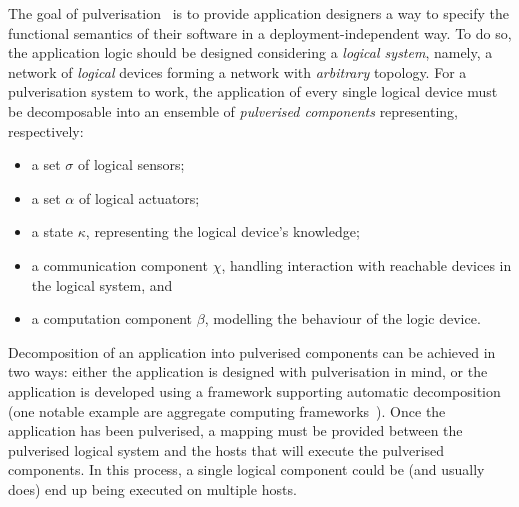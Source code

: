 \documentclass[conference]{IEEEtran}
\begin{document}
The goal of pulverisation~\cite{FI2020-pulverization}
is to provide application designers a way to specify the functional semantics of their software in a deployment-independent way.
%
To do so,
the application logic should be designed considering a \emph{logical system},
namely, a network of \emph{logical} devices forming a network with \emph{arbitrary} topology.
%
For a pulverisation system to work,
the application of every single logical device must be decomposable into an ensemble of \emph{pulverised components}
representing, respectively:
\begin{itemize}
    \item a set $\sigma$ of logical sensors;
    \item a set $\alpha$ of logical actuators;
    \item a state $\kappa$, representing the logical device's knowledge;
    \item a communication component $\chi$,
    handling interaction with reachable devices in the logical system, and
    \item a computation component $\beta$, modelling the behaviour of the logic device.
\end{itemize}
%
Decomposition of an application into pulverised components can be achieved in two ways:
either the application is designed with pulverisation in mind,
or the application is developed using a framework supporting automatic decomposition
(one notable example are aggregate computing frameworks~\cite{BealIEEEComputer2015}).
%
Once the application has been pulverised,
a mapping must be provided between the pulverised logical system and the hosts that will execute the pulverised components.
%
In this process,
a single logical component could be (and usually does) end up being executed on multiple hosts.
\end{document}
